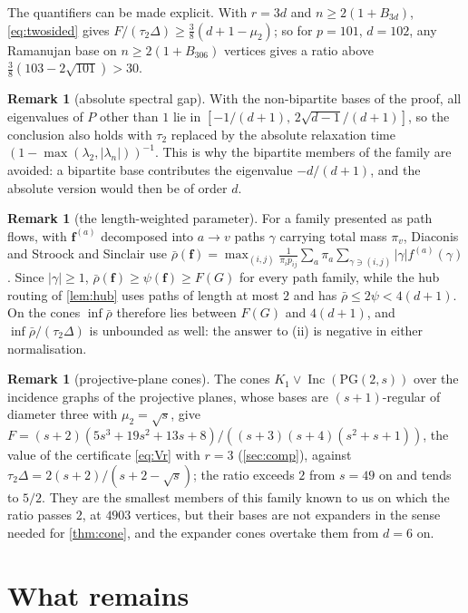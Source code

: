 \documentclass[11pt]{amsart}
\theoremstyle{definition}
\newtheorem{remark}[theorem]{Remark}
\newcommand{\bfF}{\mathbf{f}}
\newcommand{\PG}{\mathrm{PG}}
\DeclareMathOperator{\Inc}{Inc}
\begin{document}
The quantifiers can be made explicit. With $r=3d$ and $n\ge2(1+B_{3d})$, \eqref{eq:twosided} gives $F/(\tau_2\Delta)\ge\frac38(d+1-\mu_2)$; so for $p=101$, $d=102$, any Ramanujan base on $n\ge2(1+B_{306})$ vertices gives a ratio above $\frac38(103-2\sqrt{101})>30$.

\begin{remark}[absolute spectral gap]
With the non-bipartite bases of the proof, all eigenvalues of $P$ other than $1$ lie in $[-1/(d+1),\,2\sqrt{d-1}/(d+1)]$, so the conclusion also holds with $\tau_2$ replaced by the absolute relaxation time $(1-\max(\lambda_2,|\lambda_n|))^{-1}$. This is why the bipartite members of the family are avoided: a bipartite base contributes the eigenvalue $-d/(d+1)$, and the absolute version would then be of order $d$.
\end{remark}

\begin{remark}[the length-weighted parameter]
For a family presented as path flows, with $\bfF^{(a)}$ decomposed into $a\to v$ paths $\gamma$ carrying total mass $\pi_v$, Diaconis and Stroock and Sinclair use $\bar\rho(\bfF)=\max_{(i,j)}\frac1{\pi_ip_{ij}}\sum_a\pi_a\sum_{\gamma\ni(i,j)}|\gamma|f^{(a)}(\gamma)$. Since $|\gamma|\ge1$, $\bar\rho(\bfF)\ge\psi(\bfF)\ge F(G)$ for every path family, while the hub routing of \cref{lem:hub} uses paths of length at most $2$ and has $\bar\rho\le2\psi<4(d+1)$. On the cones $\inf\bar\rho$ therefore lies between $F(G)$ and $4(d+1)$, and $\inf\bar\rho/(\tau_2\Delta)$ is unbounded as well: the answer to (ii) is negative in either normalisation.
\end{remark}

\begin{remark}[projective-plane cones]
The cones $K_1\vee\Inc(\PG(2,s))$ over the incidence graphs of the projective planes, whose bases are $(s+1)$-regular of diameter three with $\mu_2=\sqrt s$, give $F=(s+2)(5s^3+19s^2+13s+8)/((s+3)(s+4)(s^2+s+1))$, the value of the certificate \eqref{eq:Vr} with $r=3$ (\cref{sec:comp}), against $\tau_2\Delta=2(s+2)/(s+2-\sqrt s)$; the ratio exceeds $2$ from $s=49$ on and tends to $5/2$. They are the smallest members of this family known to us on which the ratio passes $2$, at $4903$ vertices, but their bases are not expanders in the sense needed for \cref{thm:cone}, and the expander cones overtake them from $d=6$ on.
\end{remark}

\section{What remains}\label{sec:remain}
\end{document}
